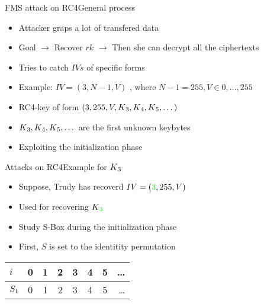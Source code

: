 \documentclass[
	aspectratio=169,	%
	onlytextwidth,		%
	t					%
	]{beamer}
\begin{document}
\begin{frame}[fragile]{FMS attack on RC4}{General process}
	\begin{itemize}[<+->]
		\item Attacker graps a lot of transfered data
		\item Goal $\rightarrow$ Recover $rk$ $\rightarrow$ Then she can decrypt all the ciphertexts
		\item Tries to catch $IVs$ of specific forms 
		\item Example: $ IV = (3, N-1, V)$ , where $N-1 = 255, V \in {0,\dots,255}$
		\item RC4-key of form $(3, 255, V, K\textsubscript{3}, K\textsubscript{4},K\textsubscript{5}, \dots)$
		\item $K\textsubscript{3}, K\textsubscript{4},K\textsubscript{5},\dots$ are the first unknown keybytes
		\item Exploiting the initialization phase
	\end{itemize}
\end{frame}

\begin{frame}[fragile]{Attacks on RC4}{Example for $K\textsubscript{3}$}
	\begin{itemize}
		\item Suppose, Trudy has recoverd $IV = (\textcolor{green}{3}, 255, V)$ 
		\item Used for recovering $K\textsubscript{\textcolor{green}{3}}$
		\item Study S-Box during the initialization phase
		\item First, $S$ is set to the identitity permutation
	\end{itemize}
	\medskip
	\begin{table}[h!]
		\begin{center}
		  \begin{tabular}{l|c|c|c|c|c|c|r}
			$i$ & 0 & 1 & 2 & 3 & 4 & 5 & \dots\\
			\hline
			$S\textsubscript{i}$ & 0 & 1 & 2 & 3 & 4 & 5 & \dots\\
		  \end{tabular}
		\end{center}
	\end{table}
\end{frame}
\end{document}
